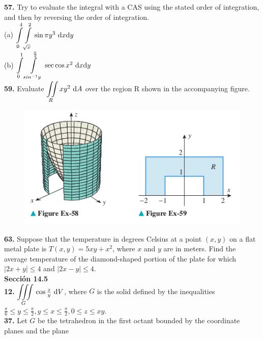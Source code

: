 \documentclass[11pt]{report}
\begin{document}
\textbf{57.} Try to evaluate the integral with a CAS using the stated order of
integration, and then by reversing the order of integration.\\

(a) $ {\displaystyle \int \limits_0^4 \int \limits_{\sqrt{x}}^2 } \, \sin{\pi y^3} \, \, \text dx \text dy $ \\

(b) $ {\displaystyle \int \limits_0^1 \int \limits_{sin^{-1}y}^{\frac{\pi}{2}} } \, \sec{\cos{x}}^2 \, \, \text dx \text dy $ \\

\textbf{59.} Evaluate $ {\displaystyle \iint \limits_R } \, xy^2 \, \, \text dA $ over
the region R shown in the accompanying figure. \\
\begin{figure}[h]
\includegraphics[scale=0.5]{img2.png}
\centering
\end{figure}

\textbf{63.} Suppose that the temperature in degrees Celsius at a point $(x, y)$
on a flat metal plate is $T(x, y) = 5xy + x^2 $, where $x$ and $y$ are in meters.
Find the average temperature of the diamond-shaped portion of the plate for which
$|2x + y| \leq 4$ and $|2x - y| \leq 4$. \\

\textbf{Sección 14.5} \\

\textbf{12.} $ {\displaystyle \iiint \limits_G } \, \cos{\frac{z}{y}} \, \, \text dV $,
where $G$ is the solid defined by the inequalities
$\frac{\pi}{6} \leq y \leq \frac{\pi}{2}, y \leq x \leq \frac{\pi}{2}, 0 \leq z \leq xy$. \\


\textbf{37.} Let $G$ be the tetrahedron in the first octant bounded by the
coordinate planes and the plane \\
\end{document}
